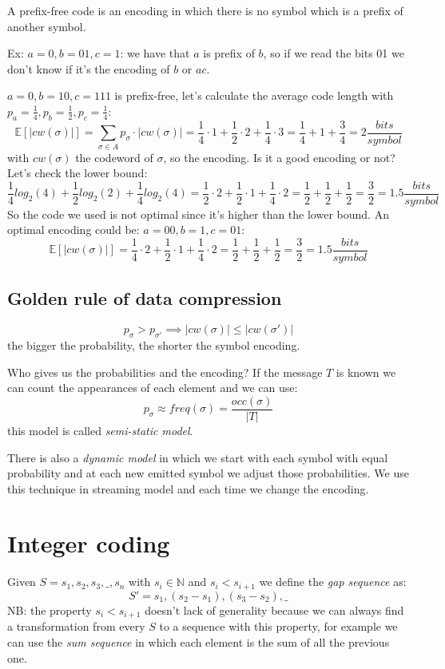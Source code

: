 A prefix-free code is an encoding in which there is no symbol which is a prefix of another symbol.

Ex: $a = 0, b = 01, c = 1$: we have that $a$ is prefix of $b$, so if we read the bits 01 we don't know if it's the encoding of $b$ or $ac$.


$a = 0, b = 10, c = 111$ is prefix-free, let's calculate the average code length with $p_a = \frac{1}{4}, p_b = \frac{1}{2}, p_c = \frac{1}{4}$:
$$
    \mathbb{E}[|cw(\sigma)|] = \sum_{\sigma \in A} p_{\sigma} \cdot |cw(\sigma)| = \frac{1}{4} \cdot 1 + \frac{1}{2} \cdot 2 + \frac{1}{4} \cdot 3 = \frac{1}{4} + 1 + \frac{3}{4} = 2 \frac{bits}{symbol}
$$
with $cw(\sigma)$ the codeword of $\sigma$, so the encoding.
Is it a good encoding or not? Let's check the lower bound:
$$
    \frac{1}{4} log_2 (4) + \frac{1}{2} log_2 (2) + \frac{1}{4} log_2 (4) = \frac{1}{2} \cdot 2 + \frac{1}{2} \cdot 1 + \frac{1}{4} \cdot 2 = \frac{1}{2} + \frac{1}{2} + \frac{1}{2} = \frac{3}{2} = 1.5 \frac{bits}{symbol}
$$
So the code we used is not optimal since it's higher than the lower bound.
An optimal encoding could be: $a = 00, b = 1, c = 01$:
$$
    \mathbb{E}[|cw(\sigma)|] = \frac{1}{4} \cdot 2 + \frac{1}{2} \cdot 1 + \frac{1}{4} \cdot 2 = \frac{1}{2} + \frac{1}{2} + \frac{1}{2} = \frac{3}{2} = 1.5 \frac{bits}{symbol}
$$

\subsection{Golden rule of data compression}
$$
    p_{\sigma} > p_{\sigma'} \implies |cw(\sigma)| \leq |cw(\sigma')|
$$
the bigger the probability, the shorter the symbol encoding.

Who gives us the probabilities and the encoding?
If the message $T$ is known we can count the appearances of each element and we can use:
$$
    p_{\sigma} \approx freq(\sigma) = \frac{occ(\sigma)}{|T|}
$$
this model is called \emph{semi-static model}.

There is also a \emph{dynamic model} in which we start with each symbol with equal probability and at each new emitted symbol we adjust those probabilities.
We use this technique in streaming model and each time we change the encoding.

\section{Integer coding}
Given $S = s_1, s_2, s_3, \_, s_n$ with $s_i \in \mathbb{N}$ and $s_i < s_{i+1}$ we define the \emph{gap sequence} as:
$$
    S' = s_1, (s_2 - s_1), (s_3 - s_2), \_
$$
NB: the property $s_i < s_{i+1}$ doesn't lack of generality because we can always find a transformation from every $S$ to a sequence with this property, for example we can use the \emph{sum sequence} in which each element is the sum of all the previous one.

